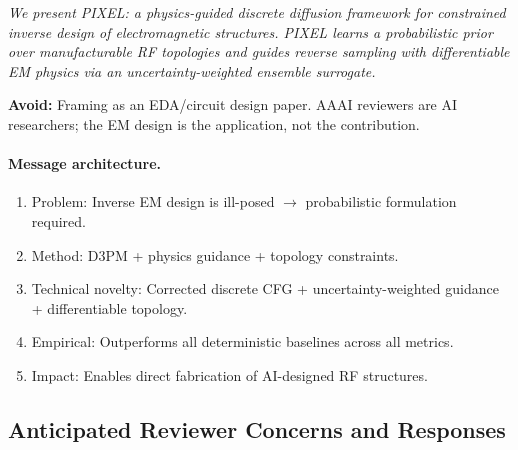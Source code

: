 \documentclass[12pt,a4paper]{article}
\theoremstyle{definition}
\theoremstyle{plain}
\theoremstyle{remark}
\begin{document}
\begin{tcolorbox}[notebox, title=Primary AAAI Abstract Frame]
\textit{We present PIXEL: a physics-guided discrete diffusion framework for constrained
inverse design of electromagnetic structures.
PIXEL learns a probabilistic prior over manufacturable RF topologies and guides reverse
sampling with differentiable EM physics via an uncertainty-weighted ensemble surrogate.}
\end{tcolorbox}

\textbf{Avoid:} Framing as an EDA/circuit design paper.
AAAI reviewers are AI researchers; the EM design is the application, not the
contribution.

\paragraph{Message architecture.}
\begin{enumerate}
  \item Problem: Inverse EM design is ill-posed $\to$ probabilistic formulation required.
  \item Method: D3PM + physics guidance + topology constraints.
  \item Technical novelty: Corrected discrete CFG + uncertainty-weighted guidance +
        differentiable topology.
  \item Empirical: Outperforms all deterministic baselines across all metrics.
  \item Impact: Enables direct fabrication of AI-designed RF structures.
\end{enumerate}

\subsection{Anticipated Reviewer Concerns and Responses}
\end{document}
